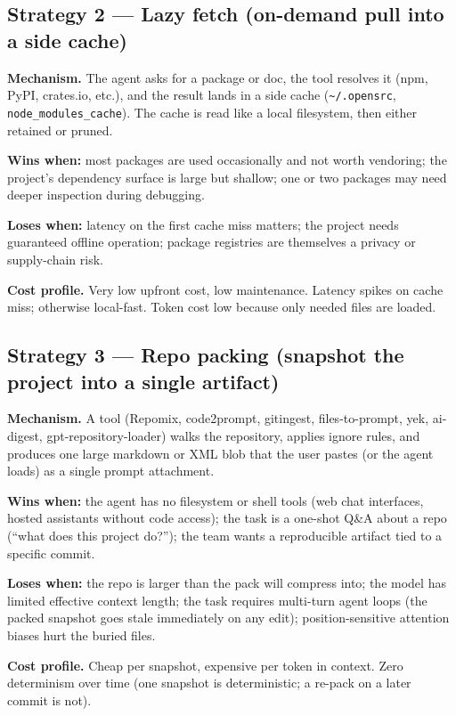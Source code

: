 \documentclass[
  11pt,
  letterpaper,
  numbers=noendperiod,
  parskip=half]{scrartcl}
\begin{document}
\subsection{Strategy 2 --- Lazy fetch (on-demand pull into a side
cache)}\label{sec-strat-fetch}

\textbf{Mechanism.} The agent asks for a package or doc, the tool
resolves it (npm, PyPI, crates.io, etc.), and the result lands in a
side cache (\texttt{\~{}/.opensrc}, \texttt{node\_modules\_cache}). The
cache is read like a local filesystem, then either retained or pruned.

\textbf{Wins when:} most packages are used occasionally and not worth
vendoring; the project's dependency surface is large but shallow; one
or two packages may need deeper inspection during debugging.

\textbf{Loses when:} latency on the first cache miss matters; the
project needs guaranteed offline operation; package registries are
themselves a privacy or supply-chain risk.

\textbf{Cost profile.} Very low upfront cost, low maintenance. Latency
spikes on cache miss; otherwise local-fast. Token cost low because only
needed files are loaded.

\subsection{Strategy 3 --- Repo packing (snapshot the project into a
single artifact)}\label{sec-strat-pack}

\textbf{Mechanism.} A tool (Repomix, code2prompt, gitingest,
files-to-prompt, yek, ai-digest, gpt-repository-loader) walks the
repository, applies ignore rules, and produces one large markdown or
XML blob that the user pastes (or the agent loads) as a single prompt
attachment.

\textbf{Wins when:} the agent has no filesystem or shell tools (web
chat interfaces, hosted assistants without code access); the task is a
one-shot Q\&A about a repo (``what does this project do?''); the team
wants a reproducible artifact tied to a specific commit.

\textbf{Loses when:} the repo is larger than the pack will compress
into; the model has limited effective context length; the task requires
multi-turn agent loops (the packed snapshot goes stale immediately on
any edit); position-sensitive attention biases hurt the buried files.

\textbf{Cost profile.} Cheap per snapshot, expensive per token in
context. Zero determinism over time (one snapshot is deterministic; a
re-pack on a later commit is not).
\end{document}
